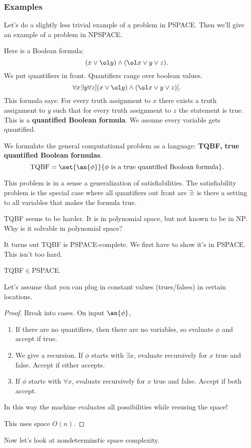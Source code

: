 \subsubsection{Examples}

Let's do a slightly less trivial example of a problem in PSPACE. Then we'll give an example of a problem in NPSPACE.
\begin{ex}
Here is a Boolean formula:
\[
(x\vee \ol y) \wedge (\ol x \vee y\vee z).
\]
We put quantifiers in front. Quantifiers range over boolean values.
\[
\forall x\exists y \forall z[(x\vee \ol y) \wedge (\ol x \vee y\vee z)].
\]
This formula says: For every truth assignment to $x$ there exists a truth assignment to $y$ such that for every truth assignment to $z$ the statement is true. This is a \textbf{quantified Boolean formula}.
We assume every variable gets quantified.

We formulate the general computational problem as a language: \textbf{TQBF, true quantified Boolean formulas}.
\[
\text{TQBF}=\set{\an{\phi}}{\phi\text{ is a true quantified Boolean formula}}.
\]

This problem is in a sense a generalization of satisfiabilities. The satisfiability problem is the special case where all quantifiers out front are $\exists$: is there a setting to all variables that makes the formula true.

TQBF seems to be harder.
It is in polynomial space, but not known to be in NP. Why is it solvable in polynomial space?

It turns out TQBF is PSPACE-complete. We first have to show it's in PSPACE. This isn't too hard.
\end{ex}
\begin{thm}
TQBF$\in $PSPACE.
\end{thm}
Let's assume that you can plug in constant values (trues/falses) in certain locations.
\begin{proof}
Break into cases. On input $\an{\phi}$,
\begin{enumerate}
\item
If there are no quantifiers, then there are no variables, so evaluate $\phi$ and accept if true.
\item 
We give a recursion. If $\phi$ starts with $\exists x$, evaluate recursively for $x$ true and false.
Accept if either accepts.
\item
If $\phi$ starts with $\forall x$, evaluate recursively for $x$ true and false.
Accept if both accept.
\end{enumerate}
In this way the machine evaluates all possibilities while resusing the space!

This uses space $O(n)$.
\end{proof}
Now let's look at nondeterminstic space complexity.

